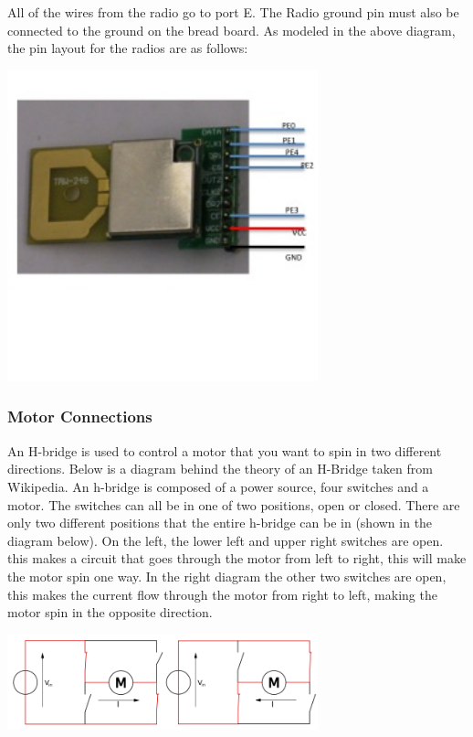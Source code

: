 All of the wires from the radio go to port E. The Radio ground pin must also be connected to the ground on the bread board. As modeled in the above diagram, the pin layout for the radios are as follows:

  \begin{center}
    \includegraphics[width=90mm]{imageSources/radioConnect.png}
  \end{center}
  \label{radioConnect}


\subsubsection{Motor Connections}
An H-bridge is used to  control a motor that you want to spin in two different directions. Below is a diagram behind the theory of an H-Bridge taken from Wikipedia. An h-bridge is composed of a power source, four switches and a motor. The switches can all be in one of two positions, open or closed. There are only two different positions that the entire h-bridge can be in (shown in the diagram below). On the left, the lower left and upper right switches are open. this makes a circuit that goes through the motor from left to right, this will make the motor spin one way.  In the right diagram the other two switches are open, this makes the current flow through the motor from right to left, making the motor spin in the opposite direction.

  \begin{center}
    \includegraphics[width=90mm]{imageSources/hBridgeConnect1.png}
  \end{center}
  \label{hBridgeConnect1}




